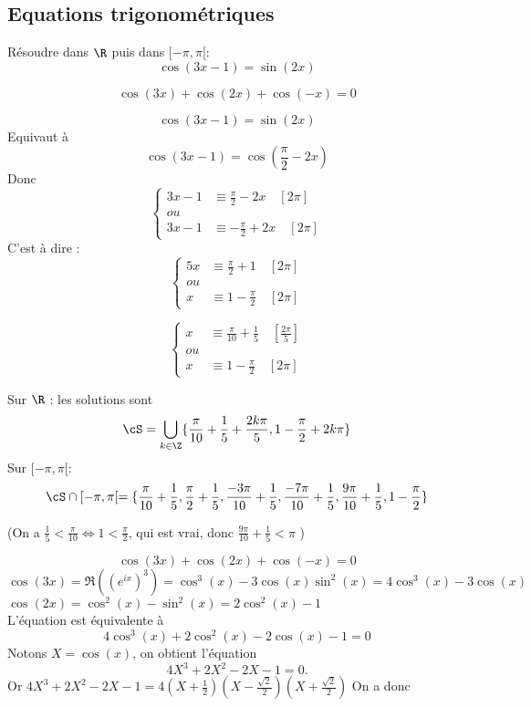 \subsection{Equations trigonométriques}


\begin{exercice}
Résoudre dans $\R$ puis dans $[-\pi, \pi[$:
\begin{equation}
\cos(3x-1)=\sin(2x)
\end{equation}


\begin{equation}
\cos(3x)+\cos(2x)+\cos(-x)=0
\end{equation}
\end{exercice}

\begin{correction}
$$\cos(3x-1)=\sin(2x)$$
Equivaut à 
$$\cos(3x-1)=\cos(\frac{\pi}{2}-2x)$$
Donc 
$$\left\{ \begin{array}{cc}
3x-1&\equiv \frac{\pi}{2}-2x\quad [2\pi]\\
ou &\\
3x-1&\equiv -\frac{\pi}{2}+2x\quad [2\pi]
\end{array}\right.$$
C'est à dire : 
$$\left\{ \begin{array}{cc}
5x&\equiv \frac{\pi}{2}+1\quad [2\pi]\\
ou &\\
x&\equiv 1-\frac{\pi}{2}\quad [2\pi]
\end{array}\right.$$

$$\left\{ \begin{array}{cc}
x&\equiv \frac{\pi}{10}+\frac{1}{5}\quad [\frac{2\pi}{5}]\\
ou &\\
x&\equiv 1-\frac{\pi}{2}\quad [2\pi]
\end{array}\right.$$






Sur $\R $ : les solutions sont $$\cS=\bigcup_{k\in \Z} \{ \frac{\pi}{10}+\frac{1}{5} + \frac{2k\pi}{5},1-\frac{\pi}{2}+2k\pi \}$$
Sur $[-\pi, \pi[$:
$$\cS\cap [-\pi, \pi[ = \{  \frac{\pi}{10}+\frac{1}{5},  \frac{\pi}{2}+\frac{1}{5} ,  \frac{-3\pi}{10}+\frac{1}{5},  \frac{-7\pi}{10}+\frac{1}{5} ,  \frac{9\pi}{10}+\frac{1}{5}, 1-\frac{\pi}{2}\}$$


(On a $\frac{1}{5}< \frac{\pi}{10} \Longleftrightarrow 1<\frac{\pi}{2} $, qui est vrai, donc $ \frac{9\pi}{10}+\frac{1}{5}<\pi$  )

\begin{equation}\tag{(2)}
\cos(3x)+\cos(2x)+\cos(-x)=0
\end{equation}
$\cos(3x) =\Re((e^{ix})^3)=\cos^3(x) -3\cos(x)\sin^2(x)=4\cos^3(x)-3\cos(x) $\\
$\cos(2x) = \cos^2(x)-\sin^2(x)=2\cos^2(x)-1$\\
L'équation est équivalente  à 
$$4\cos^3(x)+2\cos^2(x)-2\cos(x)-1=0$$
Notons $X=\cos(x)$, on obtient l'équation 
$$4X^3+2X^2-2X-1 =0.$$
Or $4X^3+2X^2-2X-1  =4(X+\frac{1}{2}) (X-\frac{\sqrt{2}}{2})(X+\frac{\sqrt{2}}{{2}})$
On a donc 


\end{correction}
